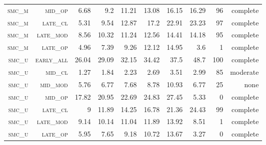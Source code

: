 \begin{landscape}
\begin{table}[!htbp]
\begin{tabular}{@{}rrrrrrr|rrr@{}}
 \textsc{smc\_m}      &  \textsc{mid\_op   }        &   6.68        &  9.2     &  11.21     &  13.08            &  16.15     &  16.29    &  96    &  complete     \\
 \textsc{smc\_m}      &  \textsc{late\_cl  }        &   5.31        &  9.54    &  12.87     &  17.2             &  22.91     &  23.23    &  97    &  complete      \\
 \textsc{smc\_m}      &  \textsc{late\_mod }        &   8.56        &  10.32   &  11.24     &  12.56            &  14.41     &  14.18    &  95    &  complete      \\
 \textsc{smc\_m}      &  \textsc{late\_op  }        &   4.96        &  7.39    &  9.26      &  12.12            &  14.95     &  3.6      &  1     &  complete      \\
 \textsc{smc\_u}      &  \textsc{early\_all}        &   26.04       &  29.09   &  32.15     &  34.42            &  37.5      &  48.7     &  100   &  complete      \\
 \textsc{smc\_u}      &  \textsc{mid\_cl   }        &   1.27        &  1.84    &  2.23      &  2.69             &  3.51      &  2.99     &  85    &  moderate       \\
 \textsc{smc\_u}      &  \textsc{mid\_mod  }        &   5.76        &  6.77    &  7.68      &  8.78             &  10.93     &  6.77     &  25    &  none    \\
 \textsc{smc\_u}      &  \textsc{mid\_op   }        &   17.82       &  20.95   &  22.69     &  24.83            &  27.45     &  5.33     &  0     &  complete      \\
 \textsc{smc\_u}      &  \textsc{late\_cl  }        &   9           &  11.89   &  14.25     &  16.78            &  21.36     &  24.43    &  99    &  complete      \\
 \textsc{smc\_u}      &  \textsc{late\_mod }        &   9.14        &  10.14   &  11.04     &  11.89            &  13.92     &  8.51     &  1     &  complete      \\
 \textsc{smc\_u}      &  \textsc{late\_op  }        &   5.95        &  7.65    &  9.18      &  10.72            &  13.67     &  3.27     &  0     &  complete      \\
\end{tabular}
\end{table}
\end{landscape}

